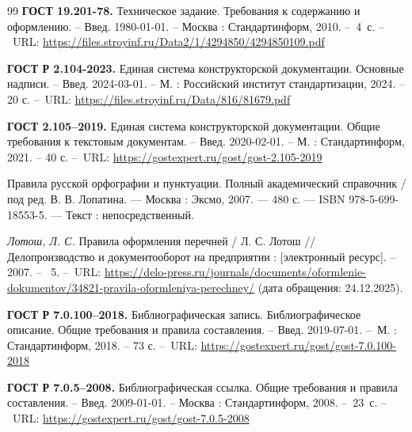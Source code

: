 \documentclass[14pt]{extarticle}
\begin{document}
\begin{thebibliography}{99}
	\textbf{ГОСТ 19.201-78.} Техническое задание. Требования к содержанию и оформлению.  -- Введ. 1980-01-01. -- Москва : Стандартинформ, 2010. --~4~с. --~URL: \href{https://files.stroyinf.ru/Data2/1/4294850/4294850109.pdf}{https://files.stroyinf.ru/Data2/1/4294850/4294850109.pdf}
	
	\textbf{ГОСТ Р 2.104-2023.} Единая система конструкторской документации. Основные надписи. -- Введ. 2024-03-01. -- М. : Российский институт стандартизации, 2024. -- 20 с. --~URL: \href{https://files.stroyinf.ru/Data/816/81679.pdf}{https://files.stroyinf.ru/Data/816/81679.pdf}
	
	\textbf{ГОСТ 2.105–2019.} Единая система конструкторской документации. Общие требования к текстовым документам. -- Введ. 2020-02-01. -- М. : Стандартинформ, 2021. -- 40 с. --~URL: \href{https://gostexpert.ru/gost/gost-2.105-2019}{https://gostexpert.ru/gost/gost-2.105-2019}
	
	Правила русской орфографии и пунктуации. Полный академический справочник / под ред. В. В. Лопатина. --- Москва : Эксмо, 2007. --- 480 с. --- ISBN 978-5-699-18553-5. --- Текст : непосредственный.
	
	\textit{Лотош, Л. С.} Правила оформления перечней / Л. С. Лотош // Делопроизводство и документооборот на предприятии : [электронный ресурс]. -- 2007. -- \textnumero~5. --~URL: \href{https://delo-press.ru/journals/documents/oformlenie-dokumentov/34821-pravila-oformleniya-perechney/}{https://delo-press.ru/journals/documents/oformlenie-dokumentov/34821-pravila-oformleniya-perechney/} (дата обращения: 24.12.2025).
	
	\textbf{ГОСТ Р 7.0.100–2018.} Библиографическая запись. Библиографическое описание. Общие требования и правила составления. -- Введ. 2019-07-01. --~М. : Стандартинформ, 2018. -- 73 с. --~URL: \href{https://gostexpert.ru/gost/gost-7.0.100-2018}{https://gostexpert.ru/gost/gost-7.0.100-2018}
	
	\textbf{ГОСТ Р 7.0.5–2008.} Библиографическая ссылка. Общие требования и правила составления. -- Введ. 2009-01-01. -- Москва : Стандартинформ, 2008. --~23~с. --~URL: \href{https://gostexpert.ru/gost/gost-7.0.5-2008}{https://gostexpert.ru/gost/gost-7.0.5-2008}
	
\end{thebibliography}
\newpage
\end{document}
